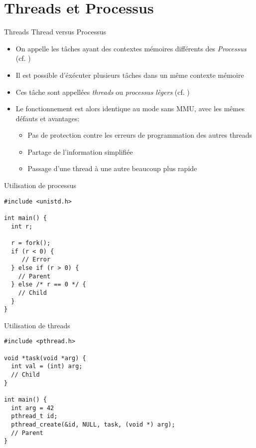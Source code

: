 \section{Threads et Processus}

\begin{frame}{Threads}
  Thread versus Processus
  \begin{itemize}
  \item On appelle les  tâches ayant des contextes mémoires différents
    des \emph{Processus} (cf. )
  \item  Il est  possible  d'éxécuter plusieurs  tâches  dans un  même
    contexte mémoire
  \item  Ces  tâche sont  appellées  \emph{threads} ou  \emph{processus
      lègers} (cf. )
  \item Le fonctionnement  est alors identique au mode  sans MMU, avec
    les mêmes défauts et avantages:
    \begin{itemize}
    \item Pas  de protection contre  les erreurs de  programmation des
      autres threads
    \item Partage de l'information simplifiée
    \item Passage d'une thread à une autre beaucoup plus rapide
    \end{itemize}
  \end{itemize}
\end{frame}

\begin{frame}[fragile]{Utilisation de processus}
\begin{lstlisting}
#include <unistd.h>

int main() {
  int r;

  r = fork();
  if (r < 0) {
     // Error
  } else if (r > 0) {
    // Parent
  } else /* r == 0 */ {
    // Child
  }
}
\end{lstlisting}
\end{frame}

\begin{frame}[fragile]{Utilisation de threads}
\begin{lstlisting}
#include <pthread.h>

void *task(void *arg) {
  int val = (int) arg;
  // Child
}

int main() {
  int arg = 42
  pthread_t id;
  pthread_create(&id, NULL, task, (void *) arg);
  // Parent
}
\end{lstlisting}
\end{frame}


